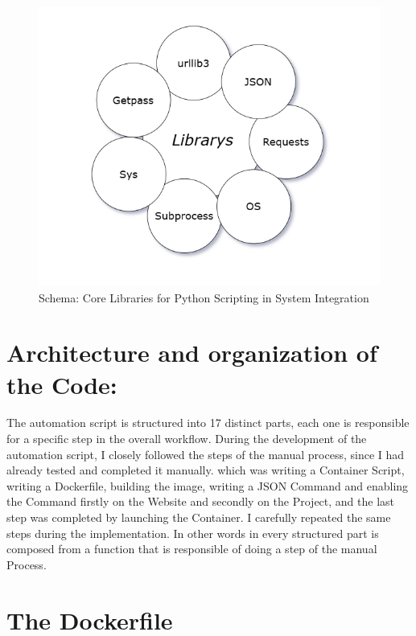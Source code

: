\begin{figure}
    \centering
    \includegraphics[width=0.7\linewidth]{en/content/lp.png}
    \caption{Schema: Core Libraries for Python Scripting in System Integration }
    \label{fig:enter-label}
\end{figure}


\section{Architecture and organization of the Code:}
 The automation script is structured into 17 distinct parts, each one is  responsible for a specific step in the overall workflow.
 During the development of the automation script, I closely followed the steps of the manual process, since I had already tested and completed it manually. which was writing a Container Script, writing a Dockerfile, building the image, writing a JSON Command and enabling the Command firstly on the Website and secondly on the Project, and the last step was completed by launching the Container. I carefully repeated the same steps during the implementation. In other words in every structured part is composed from a function that is responsible of doing a step of the manual Process.
 
 \section{The Dockerfile}
 

